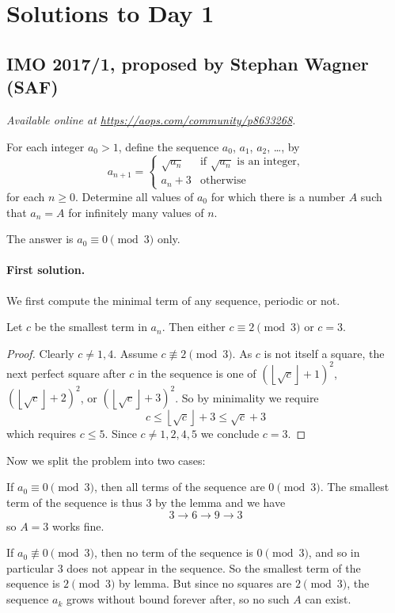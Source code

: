 \documentclass[11pt]{scrartcl}
\begin{document}
\pagebreak

\section{Solutions to Day 1}
\subsection{IMO 2017/1, proposed by Stephan Wagner (SAF)}
\textsl{Available online at \url{https://aops.com/community/p8633268}.}
\begin{mdframed}[style=mdpurplebox,frametitle={Problem statement}]
For each integer $a_0 > 1$, define the sequence $a_0$, $a_1$, $a_2$,
\dots, by
\[
  a_{n+1} =
  \begin{cases}
    \sqrt{a_n} & \text{if $\sqrt{a_n}$ is an integer,} \\
    a_n + 3 & \text{otherwise}
  \end{cases}
\]
for each $n \ge 0$.
Determine all values of $a_0$ for which there is a number $A$
such that $a_n = A$ for infinitely many values of $n$.
\end{mdframed}
The answer is $a_0 \equiv 0 \pmod 3$ only.

\paragraph{First solution.}
We first compute the minimal term of any sequence, periodic or not.

\begin{lemma*}
  Let $c$ be the smallest term in $a_n$.
  Then either $c \equiv 2 \pmod 3$ or $c = 3$.
\end{lemma*}
\begin{proof}
  Clearly $c \neq 1, 4$.
  Assume $c \not\equiv 2 \pmod 3$.
  As $c$ is not itself a square,
  the next perfect square after $c$ in the sequence
  is one of $\left( \left\lfloor \sqrt c \right\rfloor + 1\right)^2$,
  $\left( \left\lfloor \sqrt c \right\rfloor + 2\right)^2$,
  or $\left( \left\lfloor \sqrt c \right\rfloor + 3\right)^2$.
  So by minimality we require
  \[ c \le \left\lfloor \sqrt c \right\rfloor + 3 \le \sqrt c + 3 \]
  which requires $c \le 5$.
  Since $c \neq 1,2,4,5$ we conclude $c = 3$.
\end{proof}

Now we split the problem into two cases:

\begin{itemize}
\ii If $a_0 \equiv 0 \pmod 3$, then all terms of the sequence are $0 \pmod 3$.
The smallest term of the sequence is thus $3$ by the lemma
and we have \[ 3 \to 6 \to 9 \to 3 \]
so $A = 3$ works fine.

\ii If $a_0 \not\equiv 0 \pmod 3$,
then no term of the sequence is $0 \pmod 3$,
and so in particular $3$ does not appear in the sequence.
So the smallest term of the sequence is $2 \pmod 3$ by lemma.
But since no squares are $2 \pmod 3$,
the sequence $a_k$ grows without bound forever after,
so no such $A$ can exist.
\end{itemize}
\end{document}
